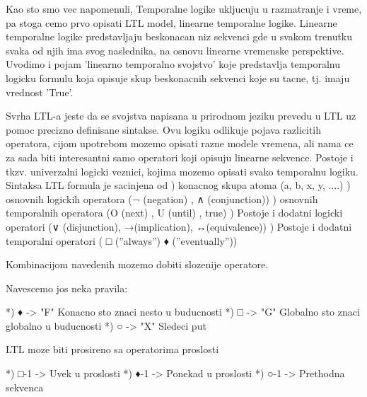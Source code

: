 \documentclass[a4paper]{article}
\begin{document}
{	\newline
	Kao sto smo vec napomenuli, Temporalne logike ukljucuju u razmatranje i vreme, pa stoga cemo prvo opisati LTL model, linearne temporalne logike. Linearne temporalne logike predstavljaju beskonacan niz sekvenci gde u svakom trenutku svaka od njih ima svog naslednika, na osnovu linearne vremenske perspektive. Uvodimo i pojam 'linearno temporalno svojstvo' koje predstavlja temporalnu logicku formulu koja opisuje skup beskonacnih sekvenci koje su tacne, tj. imaju vrednost 'True'. 

	Svrha LTL-a jeste da se svojstva napisana u prirodnom jeziku prevedu u LTL uz pomoc precizno definisane sintakse. Ovu logiku odlikuje pojava razlicitih operatora, cijom upotrebom mozemo opisati razne modele vremena, ali nama ce za sada biti interesantni samo operatori koji opisuju linearne sekvence. Postoje i tkzv. univerzalni logicki veznici, kojima mozemo opisati svako temporalnu logiku.\newline
	\newline
	Sintaksa
	\newline
	\newline
	LTL formula je sacinjena od ) konacnog skupa atoma (a, b, x, y, ....) ) osnovnih logickih operatora (¬ (negation) , ∧ (conjunction)) ) osnovnih temporalnih operatora (O (next) , U (until) , true) ) Postoje i dodatni logicki operatori (∨ (disjunction), →(implication), ↔(equivalence)) ) Postoje i dodatni temporalni operatori ( □ (”always”) ♦ (”eventually”)) \newline

	Kombinacijom navedenih mozemo dobiti slozenije operatore.

	Navescemo jos neka pravila: \newline

		*) ♦ -> "F" Konacno sto znaci nesto u buducnosti \newline
		*) □ -> "G" Globalno sto znaci globalno u buducnosti \newline
		*) ○ -> "X" Sledeci put \newline

	LTL moze biti prosireno sa operatorima proslosti \newline
		
		*) □-1 -> Uvek u proslosti \newline
		*) ♦-1 -> Ponekad u proslosti \newline
		*) ○-1 -> Prethodna sekvenca \newline

}
\end{document}
